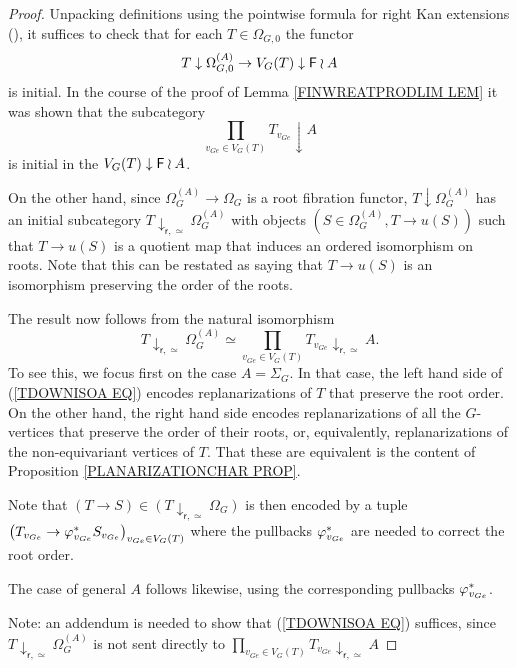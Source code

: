 \documentclass[a4paper,10pt]{article}%
\begin{document}
\begin{proof}
  Unpacking definitions using the pointwise formula for right  Kan extensions (\cite[X.3.1]{McL}), 
  it suffices to check that for each $T \in \Omega_{G,0}$ the functor
  \begin{equation}\label{LANPULLCOMA EQ}
    T \downarrow \Omega_{G,0}^{(A)}
    \to 
    V_G(T) \downarrow \mathsf{F} \wr A
  \end{equation}
  is initial.
  In the course of the proof of Lemma \ref{FINWREATPRODLIM LEM}
  it was shown that the subcategory
  \[
  \prod_{v_{Ge} \in V_G(T)} 
  T_{v_{Ge}} \downarrow A
  \]
  is initial in the $V_G(T) \downarrow \mathsf{F} \wr A$.

  On the other hand, since $\Omega_G^{(A)} \to \Omega_G$ is a root fibration functor, 
  $T \downarrow \Omega_{G}^{(A)}$
  has an initial subcategory 
  $T \downarrow_{\mathsf{r},\simeq} \Omega_{G}^{(A)}$
  with objects
  $(S \in \Omega_G^{(A)},T \to u(S))$
  such that 
  $T \to u(S)$
  is a quotient map that induces an ordered isomorphism on roots. Note that this can be restated as saying that 
  $T \to u(S)$ is an isomorphism preserving the order of the roots.


  The result now follows from the natural isomorphism
  \begin{equation}\label{TDOWNISOA EQ}
    T \downarrow_{\mathsf{r},\simeq} \Omega_{G}^{(A)} 
    \simeq
    \prod_{v_{Ge} \in V_G(T)}
    {T_{v_{Ge}} \downarrow_{\mathsf{r},\simeq} A}.
  \end{equation}
  To see this, we focus first on the case $A = \Sigma_G$.
  In that case, the left hand side of (\ref{TDOWNISOA EQ}) encodes replanarizations of $T$ that preserve the root order.
  On the other hand, the right hand side encodes replanarizations of all the $G$-vertices that preserve the order of their roots, or, equivalently, replanarizations of the non-equivariant vertices of $T$.
  That these are equivalent is the content of Proposition \ref{PLANARIZATIONCHAR PROP}.

  Note that $(T \to S) \in (T \downarrow_{\mathsf{r},\simeq} \Omega_{G})$ is then encoded by a tuple
  $\left(T_{v_{Ge}} \to \varphi^{\**}_{v_{Ge}} S_{v_{Ge}}\right)_
  {v_{Ge} \in V_G(T)}$
  where the pullbacks $\varphi^{\**}_{v_{Ge}}$ are needed to correct the root order.

  The case of general $A$ follows likewise, 
  using the corresponding pullbacks
  $\varphi^{\**}_{v_{Ge}}$.

  {\color{red} Note: an addendum is needed to show that (\ref{TDOWNISOA EQ}) suffices, since $T \downarrow_{\mathsf{r},\simeq} \Omega_{G}^{(A)}$ is not sent directly to
    $\prod_{v_{Ge} \in V_G(T)}
    {T_{v_{Ge}} \downarrow_{\mathsf{r},\simeq} A}$}
\end{proof}
\end{document}
